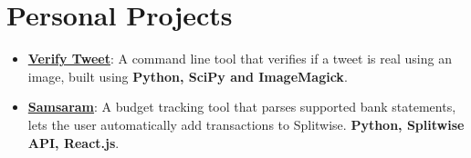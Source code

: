 \documentclass[letterpaper,11pt]{article}
\newcommand{\resumeItem}[2]{
  \item\small{
    \textbf{#1}{: #2 \vspace{-2pt}}
  }
}
\newcommand{\resumeSubItem}[2]{\resumeItem{#1}{#2}\vspace{-4pt}}
\newcommand{\resumeSubHeadingListStart}{\begin{itemize}[leftmargin=*]}
\newcommand{\resumeSubHeadingListEnd}{\end{itemize}}
\begin{document}
\section{Personal Projects}
\resumeSubHeadingListStart
  \resumeSubItem{\href{https://github.com/preetham/verifytweet}{Verify Tweet}}
    {A command line tool that verifies if a tweet is real using an image, built using \textbf{Python, SciPy and ImageMagick}.}
  \resumeSubItem{\href{https://github.com/preetham/samsaram-be}{Samsaram}}
    {A budget tracking tool that parses supported bank statements, lets the user automatically add transactions to Splitwise. \textbf{Python, Splitwise API, React.js}.}
\resumeSubHeadingListEnd
\end{document}

